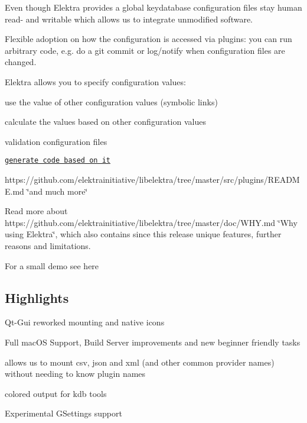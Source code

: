 \begin{DoxyEnumerate}
\item Even though Elektra provides a global keydatabase configuration files stay human read-\/ and writable which allows us to integrate unmodified software.
\item Flexible adoption on how the configuration is accessed via plugins\+: you can run arbitrary code, e.\+g. do a {\ttfamily git commit} or log/notify when configuration files are changed.
\item Elektra allows you to specify configuration values\+:
\begin{DoxyItemize}
\item use the value of other configuration values (symbolic links)
\item calculate the values based on other configuration values
\item validation configuration files
\item \href{https://master.libelektra.org/src/tools/pythongen}{\tt generate code based on it}
\item https\+://github.com/elektrainitiative/libelektra/tree/master/src/plugins/\+R\+E\+A\+D\+M\+E.\+md \char`\"{}and much more\char`\"{}
\end{DoxyItemize}
\end{DoxyEnumerate}

Read more about https\+://github.com/elektrainitiative/libelektra/tree/master/doc/\+W\+H\+Y.\+md \char`\"{}\+Why using Elektra\char`\"{}, which also contains since this release unique features, further reasons and limitations.

For a small demo see here

\href{https://asciinema.org/a/cantr04assr4jkv8v34uz9b8r}{\tt }

\subsection*{Highlights}


\begin{DoxyItemize}
\item Qt-\/\+Gui reworked mounting and native icons
\item Full mac\+OS Support, Build Server improvements and new beginner friendly tasks
\item allows us to mount csv, json and xml (and other common provider names) without needing to know plugin names
\item colored output for kdb tools
\item Experimental G\+Settings support
\end{DoxyItemize}

